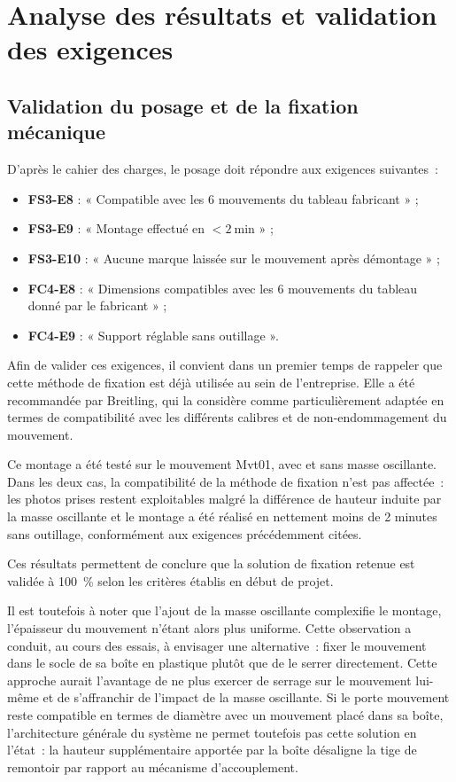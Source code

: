 \chapter{Analyse des résultats et validation des exigences}


\section{Validation du posage et de la fixation mécanique}
\label{sec:valid-posage}

D'après le cahier des charges, le posage doit répondre aux exigences suivantes~:
\begin{itemize}
      \item \textbf{FS3-E8} : « Compatible avec les 6 mouvements du tableau
          fabricant » ;
      \item \textbf{FS3-E9} : « Montage effectué en $< 2\ \mathrm{min}$ » ;
      \item \textbf{FS3-E10} : « Aucune marque laissée sur le mouvement après
          démontage » ;
      \item \textbf{FC4-E8} : « Dimensions compatibles avec les 6 mouvements du
          tableau donné par le fabricant » ;
      \item \textbf{FC4-E9} : « Support réglable sans outillage ».
\end{itemize}

Afin de valider ces exigences, il convient dans un premier temps de rappeler que
cette méthode de fixation est déjà utilisée au sein de l'entreprise. Elle a
été recommandée par Breitling, qui la considère comme particulièrement adaptée en
termes de compatibilité avec les différents calibres et de non-endommagement du
mouvement.

Ce montage a été testé sur le mouvement Mvt01, avec et sans masse
oscillante. Dans les deux cas, la compatibilité de la méthode de fixation n'est
pas affectée~: les photos prises restent exploitables malgré la différence de
hauteur induite par la masse oscillante et le montage a été réalisé en
nettement moins de 2 minutes sans outillage, conformément aux exigences précédemment citées.

Ces résultats permettent de conclure que la solution de fixation retenue est
validée à 100~\% selon les critères établis en début de projet.

Il est toutefois à noter que l'ajout de la masse
oscillante complexifie le montage, l'épaisseur du mouvement n'étant alors plus
uniforme. Cette observation a conduit, au cours des essais, à envisager une
alternative~: fixer le mouvement dans le socle de sa boîte en plastique plutôt que de le
serrer directement. Cette approche aurait l'avantage de ne plus exercer de
serrage sur le mouvement lui-même et de s'affranchir de l'impact de la masse
oscillante. Si le porte mouvement reste compatible en termes de diamètre avec un
mouvement placé dans sa boîte, l'architecture générale du système ne permet
toutefois pas cette solution en l'état~: la hauteur supplémentaire apportée par
la boîte désaligne la tige de remontoir par rapport au mécanisme d'accouplement.

